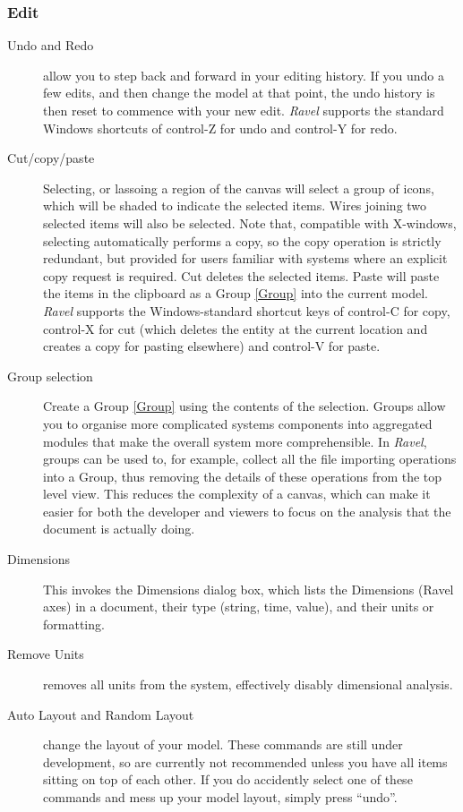 \subsubsection{Edit}

\label{Edit}
\begin{description}
\item[Undo and Redo] \label{edit:undo}  allow you to step back and forward
in your editing history. If you undo a few edits, and then change
the model at that point, the undo history is then reset to commence
with your new edit. \emph{Ravel} supports the standard Windows shortcuts
of control-Z for undo and control-Y for redo.
\item[Cut/copy/paste] \label{edit:copy}  Selecting, or lassoing a region
of the canvas will select a group of icons, which will be shaded to
indicate the selected items. Wires joining two selected items will
also be selected. Note that, compatible with X-windows, selecting
automatically performs a copy, so the copy operation is strictly redundant,
but provided for users familiar with systems where an explicit copy
request is required. Cut deletes the selected items. Paste will paste
the items in the clipboard as a Group \ref{Group} into the current
model. \emph{Ravel} supports the Windows-standard shortcut keys of
control-C for copy, control-X for cut (which deletes the entity at
the current location and creates a copy for pasting elsewhere) and
control-V for paste.
\item[Group selection] \label{edit:group} Create a Group \ref{Group} using
the contents of the selection. Groups allow you to organise more complicated
systems components into aggregated modules that make the overall system
more comprehensible. In \emph{Ravel}, groups can be used to, for example,
collect all the file importing operations into a Group, thus removing
the details of these operations from the top level view. This reduces
the complexity of a canvas, which can make it easier for both the
developer and viewers to focus on the analysis that the document is
actually doing.
\item[Dimensions] \label{edit: Dimensions} This invokes the Dimensions dialog box,
which lists the Dimensions (Ravel axes) in a document, their type
(string, time, value), and their units or formatting.
\item[Remove Units] removes all units from the system, effectively
  disably dimensional analysis.
\item[Auto Layout and Random Layout] change the layout of your
  model. These commands are still under development, so are currently
  not recommended unless you have all items sitting on top of each
  other. If you do accidently select one of these commands and mess up
  your model layout, simply press ``undo''.
\end{description}

